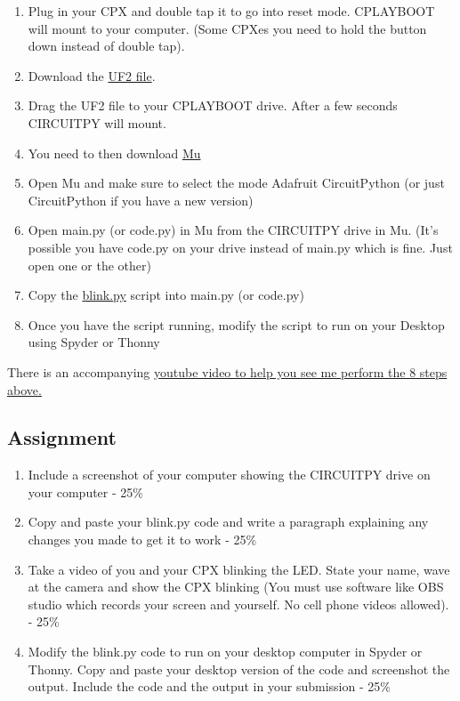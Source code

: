 \begin{enumerate}[itemsep=-5pt]
\item Plug in your CPX and double tap it to go into reset
  mode. CPLAYBOOT will mount to your computer. (Some CPXes you need to hold the button down instead of double tap).
\item Download the \href{https://circuitpython.org/downloads}{UF2
  file}.
\item Drag the UF2 file to your CPLAYBOOT drive. After a few seconds
  CIRCUITPY will mount.
\item You need to then download
  \href{https://codewith.mu/en/download}{Mu}
\item Open Mu and make sure to select the mode Adafruit CircuitPython (or just CircuitPython if you have a new version)
\item Open main.py (or code.py) in Mu from the CIRCUITPY drive in Mu. (It's possible you have code.py on your drive instead of main.py which is fine. Just open one or the other)
\item Copy the \href{https://github.com/cmontalvo251/Microcontrollers/blob/master/Circuit_Playground/CircuitPython/blink.py}{blink.py} script into main.py (or code.py)
\item Once you have the script running, modify the script to run on
  your Desktop using Spyder or Thonny
\end{enumerate}

There is an accompanying
\href{https://www.youtube.com/watch?v=XFvLn6rwm3I}{youtube video to
  help you see me perform the 8 steps above.}

\subsection{Assignment}



\begin{enumerate}[itemsep=-5pt]
\item Include a screenshot of your computer showing the CIRCUITPY drive on your computer - 25\%
\item Copy and paste your blink.py code and write a paragraph explaining any changes you made to get it to work - 25\%
\item Take a video of you and your CPX blinking the LED. State your name, wave at the camera and show the CPX blinking (You must use software like OBS studio which records your screen and yourself. No cell phone videos allowed). - 25\%
\item Modify the blink.py code to run on your desktop computer in
  Spyder or Thonny. Copy and paste your desktop version of the code
  and screenshot the output. Include the code and the output in your
  submission - 25\%
\end{enumerate}
